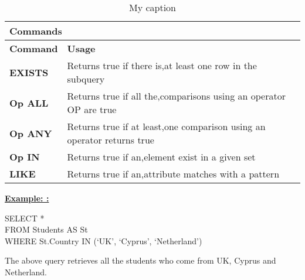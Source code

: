  
\begin{table}[h]
\centering
\caption{My caption}
\label{my-label}
\begin{tabular}{|l|l|}
\hline
\multicolumn{2}{|l|}{\textbf{Commands}}                                                                                                \\ \hline
\textbf{Command}                       & \textbf{Usage}                                                                                \\ \hline
{\color[HTML]{333333} \textbf{EXISTS}} & {\color[HTML]{333333} Returns true if there is,at least one row in the subquery}              \\ \hline
{\color[HTML]{333333} \textbf{Op ALL}} & {\color[HTML]{333333} Returns true if all the,comparisons using an operator OP are true}      \\ \hline
{\color[HTML]{333333} \textbf{Op ANY}} & {\color[HTML]{333333} Returns true if at least,one comparison using an operator returns true} \\ \hline
{\color[HTML]{333333} \textbf{Op IN}}  & {\color[HTML]{333333} Returns true if an,element exist in a given set}                        \\ \hline
{\color[HTML]{333333} \textbf{LIKE}}   & {\color[HTML]{333333} Returns true if an,attribute matches with a pattern}                    \\ \hline
\end{tabular}
\end{table}



\textbf{\underline{Example: :} }
\begin{mdframed}[backgroundcolor=gray!20][h] 
SELECT *
\\FROM Students AS St 
\\WHERE St.Country IN (‘UK’, ‘Cyprus’, ‘Netherland’)
\end{mdframed}

The above query retrieves all the students who come from UK, Cyprus and Netherland.

